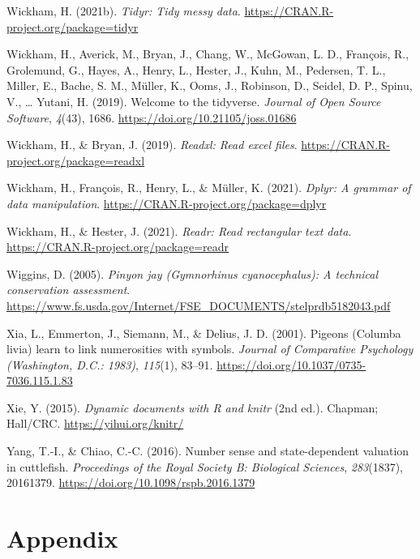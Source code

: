 \documentclass[
  ,doc,floatsintext]{apa6}
\newlength{\cslhangindent}
\newlength{\cslentryspacingunit} %
\newenvironment{CSLReferences}[2] %
 {%
  \setlength{\parindent}{0pt}
  \ifodd #1
  \let\oldpar\par
  \def\par{\hangindent=\cslhangindent\oldpar}
  \fi
  \setlength{\parskip}{#2\cslentryspacingunit}
 }%
 {}
\begin{document}
\begin{CSLReferences}{1}{0}
\leavevmode{}%
Wickham, H. (2021b). \emph{Tidyr: Tidy messy data}. \url{https://CRAN.R-project.org/package=tidyr}

\leavevmode{}%
Wickham, H., Averick, M., Bryan, J., Chang, W., McGowan, L. D., François, R., Grolemund, G., Hayes, A., Henry, L., Hester, J., Kuhn, M., Pedersen, T. L., Miller, E., Bache, S. M., Müller, K., Ooms, J., Robinson, D., Seidel, D. P., Spinu, V., \ldots{} Yutani, H. (2019). Welcome to the {tidyverse}. \emph{Journal of Open Source Software}, \emph{4}(43), 1686. \url{https://doi.org/10.21105/joss.01686}

\leavevmode{}%
Wickham, H., \& Bryan, J. (2019). \emph{Readxl: Read excel files}. \url{https://CRAN.R-project.org/package=readxl}

\leavevmode{}%
Wickham, H., François, R., Henry, L., \& Müller, K. (2021). \emph{Dplyr: A grammar of data manipulation}. \url{https://CRAN.R-project.org/package=dplyr}

\leavevmode{}%
Wickham, H., \& Hester, J. (2021). \emph{Readr: Read rectangular text data}. \url{https://CRAN.R-project.org/package=readr}

\leavevmode{}%
Wiggins, D. (2005). \emph{Pinyon jay ({Gymnorhinus} cyanocephalus): A technical conservation assessment}. \url{https://www.fs.usda.gov/Internet/FSE_DOCUMENTS/stelprdb5182043.pdf}

\leavevmode{}%
Xia, L., Emmerton, J., Siemann, M., \& Delius, J. D. (2001). Pigeons ({Columba} livia) learn to link numerosities with symbols. \emph{Journal of Comparative Psychology (Washington, D.C.: 1983)}, \emph{115}(1), 83--91. \url{https://doi.org/10.1037/0735-7036.115.1.83}

\leavevmode{}%
Xie, Y. (2015). \emph{Dynamic documents with {R} and knitr} (2nd ed.). Chapman; Hall/CRC. \url{https://yihui.org/knitr/}

\leavevmode{}%
Yang, T.-I., \& Chiao, C.-C. (2016). Number sense and state-dependent valuation in cuttlefish. \emph{Proceedings of the Royal Society B: Biological Sciences}, \emph{283}(1837), 20161379. \url{https://doi.org/10.1098/rspb.2016.1379}

\end{CSLReferences}

\newpage

\hypertarget{appendix}{%
\section{Appendix}\label{appendix}}

\renewcommand{\thetable}{A\arabic{table}}
\setcounter{table}{0}
\renewcommand{\thefigure}{A\arabic{figure}}
\setcounter{figure}{0}
\end{document}
